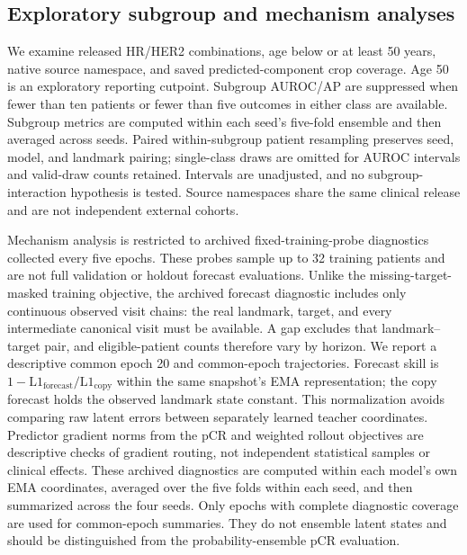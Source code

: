\subsection{Exploratory subgroup and mechanism analyses}
We examine released HR/HER2 combinations, age below or at least 50 years, native source namespace, and saved predicted-component crop coverage. Age 50 is an exploratory reporting cutpoint. Subgroup AUROC/AP are suppressed when fewer than ten patients or fewer than five outcomes in either class are available. Subgroup metrics are computed within each seed's five-fold ensemble and then averaged across seeds. Paired within-subgroup patient resampling preserves seed, model, and landmark pairing; single-class draws are omitted for AUROC intervals and valid-draw counts retained. Intervals are unadjusted, and no subgroup-interaction hypothesis is tested. Source namespaces share the same clinical release and are not independent external cohorts.

Mechanism analysis is restricted to archived fixed-training-probe diagnostics collected every five epochs. These probes sample up to 32 training patients and are not full validation or holdout forecast evaluations. Unlike the missing-target-masked training objective, the archived forecast diagnostic includes only continuous observed visit chains: the real landmark, target, and every intermediate canonical visit must be available. A gap excludes that landmark--target pair, and eligible-patient counts therefore vary by horizon. We report a descriptive common epoch 20 and common-epoch trajectories. Forecast skill is $1-\mathrm{L1}_{\mathrm{forecast}}/\mathrm{L1}_{\mathrm{copy}}$ within the same snapshot's EMA representation; the copy forecast holds the observed landmark state constant. This normalization avoids comparing raw latent errors between separately learned teacher coordinates. Predictor gradient norms from the pCR and weighted rollout objectives are descriptive checks of gradient routing, not independent statistical samples or clinical effects. These archived diagnostics are computed within each model's own EMA coordinates, averaged over the five folds within each seed, and then summarized across the four seeds. Only epochs with complete diagnostic coverage are used for common-epoch summaries. They do not ensemble latent states and should be distinguished from the probability-ensemble pCR evaluation.

